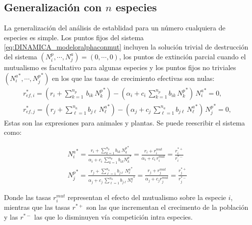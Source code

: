 \subsection{Generalización con $n$ especies}
 
La generalización del análisis de establidad para un número cualquiera de especies es simple. Los puntos fijos del sistema \ref{eq:DINAMICA_modeloralphaconmut} incluyen la solución trivial de destrucción del sistema $(N_{i}^p,\cdots, N_{j}^a) = (0, \cdots,0)$, los puntos de extinción parcial cuando el mutualismo es facultativo para algunas especies y los puntos fijos no triviales $({N^{a}_{i}}^*,\cdots,{N^{p}_{j}}^*)$ en los que las tasas de crecimiento efectivas son nulas:
\begin{align}
r^{*}_{ef,i}  = (r_{i}+ \sum_{k=1}^{n_{p}}\,  b_{ik}\, {N^p_{k}}^*)- (\alpha_{i}+c_{i}\, \sum_{k=1}^{n_{p}} b_{ik}\, {N^{p}_k}^* )\, {N^{a}_{i}}^* = 0 \nonumber ,\\
r^{*}_{ef,j}  = (r_{j}+ \sum_{\ell=1}^{n_{a}} b_{j\ell}\, {N^{a}_{\ell}}^*)- (\alpha_{j}+c_{j}\, \sum_{\ell=1}^{n_{a}} b_{j\ell}\, {N^{a}_\ell}^* )\, {N^{p}_{j}}^* 
=0 ,
\label{eq:effrate2}
\end{align}
Estas son las expresiones para animales y plantas. Se puede reescribir el sistema como:

\begin{align}  
{N^{a}_{i}}^* = \frac{r_{i}+\sum_{k=1}^{n_{p}}b_{ik}\, {N^{p}_{k}}^*}{\alpha_{i}+c_{i}\,\sum_{k=1}^{n_{p}}{b_{ik}N^{p}_{k}}^*} = 
  \frac{r_{i}+r_{i}^{mut}}{\alpha_{i}+c_{i}\, r_{i}^{mut}} = 
  \frac{r_{i}^{*+}}{r_{i}^{*-}} \nonumber\\
{N^{p}_{j}}^*=\frac{r_{j}+\sum_{\ell=1}^{n_{a}}b_{j\ell}\, {N^{a}_{\ell}}^*}{\alpha_{j}+c_{j}\,\sum_{\ell=1}^{n_{a}}{b_{j\ell}N^{a}_{\ell}}^*} =
  \frac{r_{j}+r_{j}^{mut}}{\alpha_{j}+c_{j}r_{j}^{mut}} =
  \frac{r_{j}^{*+}}{r_{j}^{*-}}
\end{align}

Donde las tasas $r_{i}^{mut}$ representan el efecto del mutualismo sobre la especie $i$, mientras que las tasas $r^{*+}$ son las que incrementan el crecimento de la población y las $r^{*-}$ las que lo disminuyen vía competición intra especies. 

